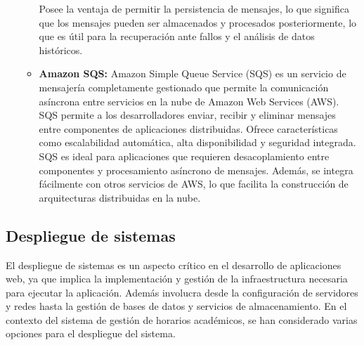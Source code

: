 \begin{itemize}
\begin{itemize}
        Posee la ventaja de permitir la persistencia de mensajes, lo que significa que los mensajes pueden ser almacenados y procesados posteriormente, lo que es útil para la recuperación ante fallos y el análisis de datos históricos.
        \item \textbf{Amazon SQS:} Amazon Simple Queue Service (SQS) es un servicio de mensajería completamente gestionado que permite la comunicación asíncrona entre servicios en la nube de Amazon Web Services (AWS). SQS permite a los desarrolladores enviar, recibir y eliminar mensajes entre componentes de aplicaciones distribuidas. Ofrece características como escalabilidad automática, alta disponibilidad y seguridad integrada.
        SQS es ideal para aplicaciones que requieren desacoplamiento entre componentes y procesamiento asíncrono de mensajes. Además, se integra fácilmente con otros servicios de AWS, lo que facilita la construcción de arquitecturas distribuidas en la nube.
    \end{itemize}
\end{itemize}

\subsection{Despliegue de sistemas}

El despliegue de sistemas es un aspecto crítico en el desarrollo de aplicaciones web, ya que implica la implementación y gestión de la infraestructura necesaria para ejecutar la aplicación. Además involucra desde la configuración de servidores y redes hasta la gestión de bases de datos y servicios de almacenamiento. En el contexto del sistema de gestión de horarios académicos, se han considerado varias opciones para el despliegue del sistema.

